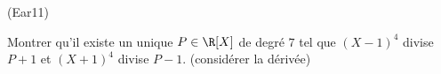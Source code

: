 \begin{tiny}(Ear11)\end{tiny} Montrer qu'il existe un unique $P \in \R[X]$ de degré $7$ tel que $(X-1)^{4}$ divise $P+1$
et $(X+1)^{4}$ divise $P-1$. (considérer la dérivée)
